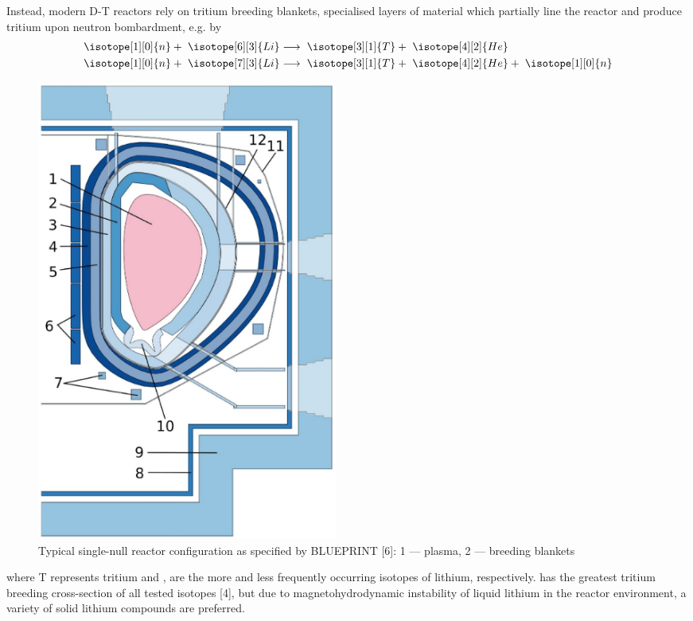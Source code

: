 Instead, modern D-T reactors rely on tritium breeding blankets, specialised
layers of material which partially line the reactor and produce tritium upon
neutron bombardment, e.g. by 
\begin{align}
	\isotope[1][0]{n} + \hspace{3pt} \isotope[6][3]{Li} 
	&\longrightarrow \hspace{3pt} 
	\isotope[3][1]{T} + \hspace{3pt}\isotope[4][2]{He} \\
	\isotope[1][0]{n} + \hspace{3pt} \isotope[7][3]{Li} 
	&\longrightarrow \hspace{3pt} 
	\isotope[3][1]{T} + \hspace{3pt} \isotope[4][2]{He} + \hspace{3pt} \isotope[1][0]{n}
\end{align}
\begin{figure}
  \vspace{-20pt}
  \begin{center}
    \includegraphics[width=0.48\textwidth]{fig1_tokamakdiagram.png}
  \end{center}
  \caption{Typical single-null reactor configuration as specified by BLUEPRINT [6]: 1 — plasma,
2 — breeding blankets }
\label{fig:tokamak}
\end{figure}
where T represents tritium and ,  are the more and
less frequently occurring isotopes of lithium, respectively.  has
the greatest tritium breeding cross-section of all tested isotopes [4], but due
to magnetohydrodynamic instability of liquid lithium in the reactor environment,
a variety of solid lithium compounds are preferred.

